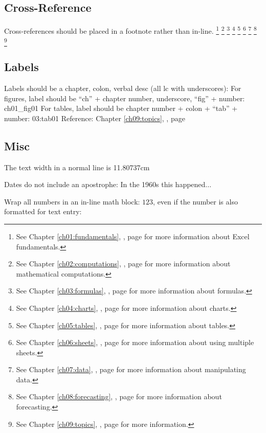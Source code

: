 \begin{enumerate}[resume]
\subsection{Cross-Reference}
Cross-references should be placed in a footnote rather than in-line.
\footnote{See Chapter \ref{ch01:fundamentals}, , page \pageref{ch01:fundamentals} for more information about Excel fundamentals.}
\footnote{See Chapter \ref{ch02:computations}, , page \pageref{ch02:computations} for more information about mathematical computations.}
\footnote{See Chapter \ref{ch03:formulas}, , page \pageref{ch03:formulas} for more information about formulas.}
\footnote{See Chapter \ref{ch04:charts}, , page \pageref{ch04:charts} for more information about charts.}
\footnote{See Chapter \ref{ch05:tables}, , page \pageref{ch05:tables} for more information about tables.}
\footnote{See Chapter \ref{ch06:sheets}, , page \pageref{ch06:sheets} for more information about using multiple sheets.}
\footnote{See Chapter \ref{ch07:data}, , page \pageref{ch07:data} for more information about manipulating data.}
\footnote{See Chapter \ref{ch08:forecasting}, , page \pageref{ch08:forecasting} for more information about forecasting.}
\footnote{See Chapter \ref{ch09:topics}, , page \pageref{ch09:topics} for more information.}

\subsection{Labels}
Labels should be a chapter, colon, verbal desc (all lc with underscores): \label{03:title}
For figures, label should be ``ch'' + chapter number, underscore, ``fig'' + number: ch01_fig01
For tables, label should be chapter number + colon + ``tab'' + number: 03:tab01
Reference: Chapter \ref{ch09:topics}, , page \pageref{ch09:topics}

\subsection{Misc}
The text width in a normal line is 11.80737cm

Dates do not include an apostrophe: In the 1960s this happened...

Wrap all numbers in an in-line math block: $ 123 $, even if the number is also formatted for text entry: 


\end{enumerate}
